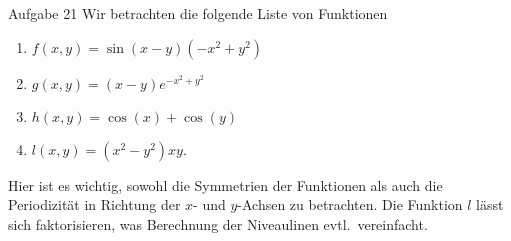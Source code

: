 \documentclass[12pt]{article}
\begin{document}
\begin{nexercise}{Aufgabe 2}{1}
        Wir betrachten die folgende Liste von Funktionen

        \begin{varwidth}{\textwidth}
                \begin{enumerate}[label=(\alph*)]
                        \item $f(x,y)=\sin(x-y)(-x^2+y^2)$
                        \item $g(x,y)=(x-y)e^{-x^2+y^2}$
                        \item $h(x,y)=\cos(x)+\cos(y)$
                        \item $l(x,y)=(x^2-y^2)xy.$
                \end{enumerate}
        \end{varwidth}
\end{nexercise}

\begin{tips}{1}
        Hier ist es wichtig, sowohl die Symmetrien der Funktionen als auch die Periodizität in Richtung der $x$- und $y$-Achsen zu betrachten. Die Funktion $l$ lässt sich faktorisieren, was Berechnung der Niveaulinen evtl.\ vereinfacht.
\end{tips}
\end{document}

